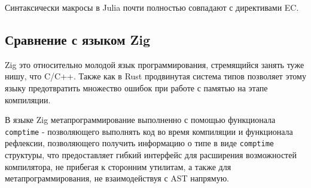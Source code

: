 Синтаксически макросы в Julia почти полностью совпадают с директивами EC.

\subsection{Сравнение с языком Zig}
Zig это относительно молодой язык программирования, стремящийся занять туже нишу, что C/C++. 
Также как в Rust продвинутая система типов позволяет этому языку предотвратить множество ошибок при работе с памятью на этапе компиляции.

В языке Zig метапрограммирование выполненно с помощью функционала \verb|comptime| - позволяющего выполнять код во время компиляции и функционала рефлексии, 
позволяющего получить информацию о типе в виде \verb|comptime| структуры, что предоставляет гибкий интерфейс для расширения возможностей компилятора, не прибегая 
к сторонним утилитам, а также для метапрограммирования, не взаимодействуя с AST напрямую.